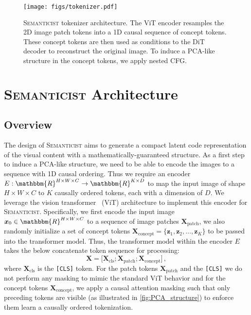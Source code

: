 \documentclass[10pt,twocolumn,letterpaper]{article}
\DeclareRobustCommand{\modelname}{\textsc{Semanticist}\xspace}
\begin{document}
\begin{figure}[t]
    \centering
    \texttt{[image: figs/tokenizer.pdf]}
    \caption{
    \modelname tokenizer architecture. 
    The ViT encoder resamples the 2D image patch tokens into a 1D causal sequence of concept tokens. 
    These concept tokens are then used as conditions to the DiT decoder to reconstruct the original image.
    To induce a PCA-like structure in the concept tokens, we apply nested CFG.}
    \label{fig:arch}
\end{figure}

\section{\modelname Architecture}

\subsection{Overview}
The design of \modelname aims to generate a compact latent code representation of the visual content with a mathematically-guaranteed structure.
As a first step to induce a PCA-like structure, we need to be able to encode the images to a sequence with 1D causal ordering.
Thus we require an encoder $E:\mathbbm{R}^{H\times W\times C}\rightarrow\mathbbm{R}^{K\times D}$ to map the input image of shape $H\times W \times C$ to $K$ causally ordered tokens, each with a dimension of $D$.
We leverage the vision transformer~\cite{vit} (ViT) architecture to implement this encoder for \modelname.
Specifically, we first encode the input image $\bm{x}_0\in\mathbbm{R}^{H\times W\times C}$ to a sequence of image patches $\bm{X}_{\text{patch}}$, we also randomly initialize a set of concept tokens $\bm{X}_{\text{concept}}=\{\bm{z}_1, \bm{z}_2, \dots, \bm{z}_K\}$ to be passed into the transformer model.
Thus, the transformer model within the encoder $E$ takes the below concatenate token sequence for processing:
\begin{equation}
\bm{X}=\lbrack\bm{X}_{\text{cls}};\bm{X}_{\text{patch}};\bm{X}_{\text{concept}}\rbrack \,, \nonumber
\end{equation}
where $\bm{X}_{\text{cls}}$ is the \texttt{[CLS]} token. For the patch tokens $\bm{X}_{\text{patch}}$ and the \texttt{[CLS]} we do not perform any masking to mimic the standard ViT behavior and for the concept tokens $\bm{X}_{\text{concept}}$, we apply a causal attention masking such that only preceding tokens are visible (as illustrated in \cref{fig:PCA_structure}) to enforce them learn a causally ordered tokenization.
\end{document}
